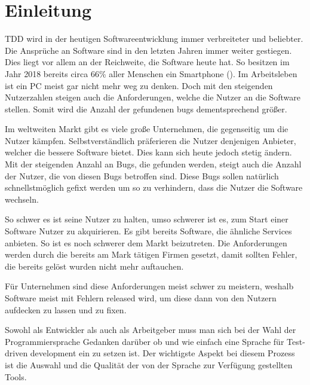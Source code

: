 \section{Einleitung}\label{einleitung}

TDD wird in der heutigen Softwareentwicklung immer verbreiteter und beliebter.
Die Ansprüche an Software sind in den letzten Jahren immer weiter gestiegen.
Dies liegt vor allem an der Reichweite, die Software heute hat. So besitzen
im Jahr 2018 bereits circa 66\% aller Menschen ein Smartphone
(\cite{FraukeSchobelt:Smartphone}). Im Arbeitsleben ist ein PC meist gar nicht
mehr weg zu denken. Doch mit den steigenden Nutzerzahlen steigen auch die
Anforderungen, welche die Nutzer an die Software stellen. Somit wird die Anzahl
der gefundenen \Glspl{bug} dementsprechend größer.

Im weltweiten Markt gibt es viele große Unternehmen, die gegenseitig um die
Nutzer kämpfen. Selbstverständlich präferieren die Nutzer denjenigen Anbieter,
welcher die bessere Software bietet. Dies kann sich heute jedoch stetig ändern.
Mit der steigenden Anzahl an Bugs, die gefunden werden, steigt auch die Anzahl
der Nutzer, die von diesen Bugs betroffen sind. Diese Bugs sollen natürlich
schnellstmöglich gefixt werden um so zu verhindern, dass die Nutzer die Software
wechseln.

So schwer es ist seine Nutzer zu halten, umso schwerer ist es, zum Start einer
Software Nutzer zu akquirieren. Es gibt bereits Software, die ähnliche Services
anbieten. So ist es noch schwerer dem Markt beizutreten. Die Anforderungen
werden durch die bereits am Mark tätigen Firmen gesetzt, damit sollten Fehler,
die bereits gelöst wurden nicht mehr auftauchen.

Für Unternehmen sind diese Anforderungen meist schwer zu meistern, weshalb
Software meist mit Fehlern released wird, um diese dann von den Nutzern
aufdecken zu lassen und zu fixen.

Sowohl als Entwickler als auch als Arbeitgeber muss man sich bei der Wahl der
Programmiersprache Gedanken darüber ob und wie einfach eine Sprache für
Test-driven development ein zu setzen ist. Der wichtigste Aspekt bei diesem
Prozess ist die Auswahl und die Qualität der von der Sprache zur Verfügung
gestellten Tools.